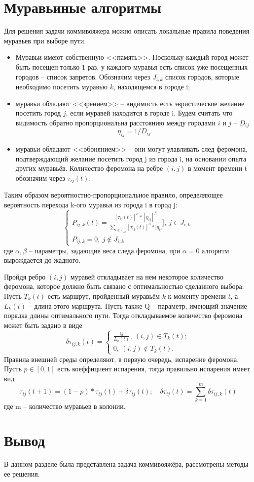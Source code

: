 \section{Муравьиные алгоритмы}
Для решения задачи коммивояжера можно описать  локальные правила поведения муравьев при выборе пути.
\begin{itemize}
	\item Муравьи имеют собственную <<память>>. Поскольку каждый город может быть посещен только 1 раз, у каждого муравья есть список уже посещенных городов -- список запретов. Обозначим через $J_{i,k}$ список городов, которые необходимо посетить муравью $k$, находящемся в городе i;
	\item муравьи обладают <<зрением>>  -- видимость есть эвристическое желание посетить город $j$, если муравей находится в городе i. Будем считать что видимость обратно пропорциональна расстоянию между городами $i$ и $j$ -- $D_{ij}$
	\begin{equation}
		\eta_{ij}=1/D_{ij}
	\end{equation}
	\item муравьи обладают <<обонянием>> -- они могут улавливать след феромона, подтверждающий желание посетить город j из города i, на основании опыта других муравьёв. Количество феромона на ребре $(i,j)$ в момент времени t обозначим через $\tau_{ij}(t)$.
\end{itemize}
\par Таким образом вероятностно-пропорциональное правило, определяющее вероятность перехода k-ого муравья из города i в город j:
\begin{equation}
	\begin{cases}
		P_{ij,k}(t)=\frac{[\tau_{ij}(t)]^{\alpha}*[\eta_{ij}]^{\beta}}{\sum\limits_{l\in J_{i,k}}[\tau_{ij}(t)]^{\alpha}*[\eta_{ij}}],\: j\in J_{i,k}\\
		P_{ij,k}=0, \: j \notin J_{i,k}
	\end{cases}
\end{equation}
где $\alpha, \beta$ -- параметры, задающие веса следа феромона, при $\alpha =0$ алгоритм вырождается до жадного.
\par Пройдя ребро $(i,j)$ муравей откладывает на нем некоторое количество феромона, которое должно быть связано с оптимальностью сделанного выбора. Пусть $T_{k}(t)$ есть маршрут, пройденный муравьём $k$ к моменту времени $t$, а $L_{k}(t)$ -- длина этого маршрута. Пусть также Q -- параметр, имеющий значение порядка длины оптимального пути. Тогда откладываемое количество феромона может быть задано в виде
\begin{equation}
	\delta\tau_{ij,k}(t)=\begin{cases}
		\frac{Q}{L_{k}(t)},\: (i,j)\in T_{k}(t);\\
		0, \: (i,j)\notin T_{k}(t).
	\end{cases}
\end{equation}
Правила внешней среды определяют, в первую очередь, испарение феромона. Пусть $p \in [0,1]$ есть коеффициент испарения, тогда правильно испарения имеет вид
\begin{equation}
	\tau_{ij}(t+1)=(1-p)*\tau_{ij}(t)+\delta\tau_{ij}(t);\quad \delta\tau_{ij}(t)=\sum\limits_{k=1}^{m}\delta\tau_{ij,k}(t)
\end{equation}
где m -- количество муравьев в колонии.
\section{Вывод}
В данном разделе была представлена задача коммивояжёра, рассмотрены методы ее решения.